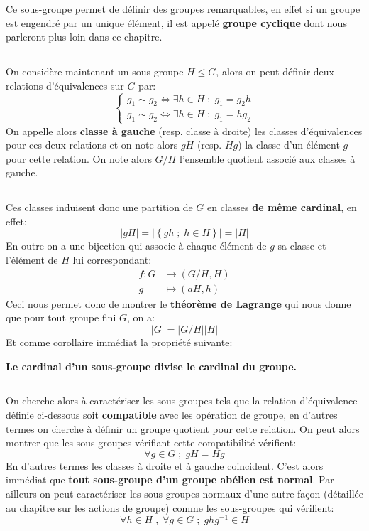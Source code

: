 Ce sous-groupe permet de définir des groupes remarquables, en effet si un groupe est engendré par un unique élément, il est appelé \textbf{groupe cyclique} dont nous parleront plus loin dans ce chapitre.
\pagebreak

\subsection*{}
On considère maintenant un sous-groupe \( H \leq G \), alors on peut définir deux relations d'équivalences sur \( G \) par:
\[ 
   \begin{cases}
      g_1 \sim g_2 \iff \exists h \in H \; ; \; g_1 = g_2h\\
      g_1 \sim g_2 \iff \exists h \in H \; ; \; g_1 = hg_2
   \end{cases}
\] 
On appelle alors \textbf{classe à gauche} (resp. classe à droite) les classes d'équivalences pour ces deux relations et on note alors \( gH \) (resp. \( Hg \)) la classe d'un élément \( g \) pour cette relation. On note alors \( G/H \) l'ensemble quotient associé aux classes à gauche.
\subsection*{}
Ces classes induisent donc une partition de \( G \) en classes \textbf{de même cardinal}, en effet:
\[ 
   |gH| = \left|\left\{ gh \; ; \; h \in H \right\} \right| = |H|
\]
En outre on a une bijection qui associe à chaque élément de \( g \) sa classe et l'élément de \( H \) lui correspondant:
\[ 
   \begin{aligned}
      f : G &\longrightarrow (G/H, H)\\
      g &\longmapsto (aH, h)
   \end{aligned}
\]
Ceci nous permet donc de montrer le \textbf{théorème de Lagrange} qui nous donne que pour tout groupe fini \( G \), on a:
\[ 
   |G| = |G/H||H|
\]
Et comme corollaire immédiat la propriété suivante:
\begin{center}
   \textbf{Le cardinal d'un sous-groupe divise le cardinal du groupe.}
\end{center}
\subsection*{}
On cherche alors à caractériser les sous-groupes tels que la relation d'équivalence définie ci-dessous soit \textbf{compatible} avec les opération de groupe, en d'autres termes on cherche à définir un groupe quotient pour cette relation. On peut alors montrer que les sous-groupes vérifiant cette compatibilité vérifient:
\[ 
   \forall g \in G \; ; \; gH = Hg 
\]
En d'autres termes les classes à droite et à gauche coincident. C'est alors immédiat que \textbf{tout sous-groupe d'un groupe abélien est normal}. Par ailleurs on peut caractériser les sous-groupes normaux d'une autre façon (détaillée au chapitre sur les actions de groupe) comme les sous-groupes qui vérifient:
\[ 
   \forall h \in H \; , \; \forall g \in G \; ; \; ghg^{-1} \in H 
\]

